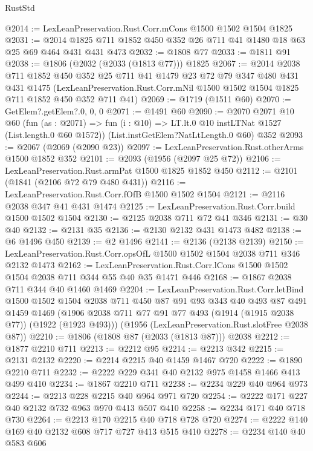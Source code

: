 \begin{lexlean}{RustStd}
\begin{coremodule}
@2014 := LexLeanPreservation.Rust.Corr.mCons @1500 @1502 @1504 @1825
@2031 := @2014 @1825 @711 @1852 @450 @352 @26 @711 @41 @1480 @18 @63 @25 @69 @464 @431 @431 @473
@2032 := @1808 @77
@2033 := @1811 @91
@2038 := @1806 (@2032 (@2033 (@1813 @77))) @1825
@2067 := @2014
    @2038
    @711
    @1852
    @450
    @352
    @25
    @711
    @41
    @1479
    @23
    @72
    @79
    @347
    @480
    @431
    @431
    @1475
    (LexLeanPreservation.Rust.Corr.mNil @1500 @1502 @1504 @1825 @711 @1852 @450 @352 @711 @41)
@2069 := @1719 (@1511 @60)
@2070 := GetElem?.getElem?.{0, 0, 0}
@2071 := @1491 @60
@2090 := @2070
    @2071
    @10
    @60
    (fun (as : @2071) => fun (i : @10) => LT.lt.{0} @10 instLTNat @1527 (List.length.{0} @60 @1572))
    (List.instGetElem?NatLtLength.{0} @60)
    @352
@2093 := @2067 (@2069 (@2090 @23))
@2097 := LexLeanPreservation.Rust.otherArms @1500 @1852 @352
@2101 := @2093 (@1956 (@2097 @25 @72))
@2106 := LexLeanPreservation.Rust.armPat @1500 @1825 @1852 @450
@2112 := @2101 (@1841 (@2106 @72 @79 @480 @431))
@2116 := LexLeanPreservation.Rust.Corr.fOfB @1500 @1502 @1504
@2121 := @2116 @2038 @347 @41 @431 @1474
@2125 := LexLeanPreservation.Rust.Corr.build @1500 @1502 @1504
@2130 := @2125 @2038 @711 @72 @41 @346
@2131 := @30 @40
@2132 := @2131 @35
@2136 := @2130 @2132 @431 @1473 @482
@2138 := @6 @1496 @450
@2139 := @2 @1496
@2141 := @2136 (@2138 @2139)
@2150 := LexLeanPreservation.Rust.Corr.opsOfL @1500 @1502 @1504 @2038 @711 @346 @2132 @1473
@2162 := LexLeanPreservation.Rust.Corr.lCons
    @1500
    @1502
    @1504
    @2038
    @711
    @344
    @55
    @40
    @35
    @1471
    @446
@2168 := @1867 @2038 @711 @344 @40 @1460 @1469
@2204 := LexLeanPreservation.Rust.Corr.letBind
    @1500
    @1502
    @1504
    @2038
    @711
    @450
    @87
    @91
    @93
    @343
    @40
    @493
    @87
    @491
    @1459
    @1469
    (@1906 @2038 @711 @77 @91 @77 @493 (@1914 (@1915 @2038 @77)) (@1922 (@1923 @493)))
    (@1956 (LexLeanPreservation.Rust.slotFree @2038 @87))
@2210 := @1806 (@1808 @87 (@2033 (@1813 @87))) @2038
@2212 := @1877 @2210 @711
@2213 := @2212 @95
@2214 := @2213 @342
@2215 := @2131 @2132
@2220 := @2214 @2215 @40 @1459 @1467 @720
@2222 := @1890 @2210 @711
@2232 := @2222 @229 @341 @40 @2132 @975 @1458 @1466 @413 @499 @410
@2234 := @1867 @2210 @711
@2238 := @2234 @229 @40 @964 @973
@2244 := @2213 @228 @2215 @40 @964 @971 @720
@2254 := @2222 @171 @227 @40 @2132 @732 @963 @970 @413 @507 @410
@2258 := @2234 @171 @40 @718 @730
@2264 := @2213 @170 @2215 @40 @718 @728 @720
@2274 := @2222 @140 @169 @40 @2132 @608 @717 @727 @413 @515 @410
@2278 := @2234 @140 @40 @583 @606

\end{coremodule}
\end{lexlean}
